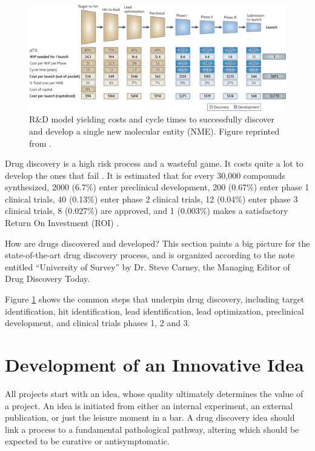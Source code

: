 \begin{figure}
\centering
\includegraphics[width=\textwidth]{Background/DrugDiscoveryProcess.png}
\caption{R\&D model yielding costs and cycle times to successfully discover and develop a single new molecular entity (NME). Figure reprinted from \citep{716}.}
\label{fig:DrugDiscoveryProcess}
\end{figure}

Drug discovery is a high risk process and a wasteful game. It costs quite a lot to develop the ones that fail \citep{688}. It is estimated that for every 30,000 compounds synthesized, 2000 (6.7\%) enter preclinical development, 200 (0.67\%) enter phase 1 clinical trials, 40 (0.13\%) enter phase 2 clinical trials, 12 (0.04\%) enter phase 3 clinical trials, 8 (0.027\%) are approved, and 1 (0.003\%) makes a satisfactory Return On Investment (ROI) \citep{713}.

How are drugs discovered and developed? This section paints a big picture for the state-of-the-art drug discovery process, and is organized according to the note entitled ``University of Survey'' by Dr. Steve Carney, the Managing Editor of Drug Discovery Today.

Figure \ref{fig:DrugDiscoveryProcess} \citep{716} shows the common steps that underpin drug discovery, including target identification, hit identification, lead identification, lead optimization, preclinical development, and clinical trials phases 1, 2 and 3.

\section{Development of an Innovative Idea}

All projects start with an idea, whose quality ultimately determines the value of a project. An idea is initiated from either an internal experiment, an external publication, or just the leisure moment in a bar. A drug discovery idea should link a process to a fundamental pathological pathway, altering which should be expected to be curative or antisymptomatic.

